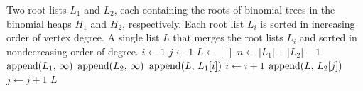 
\begin{algorithmic}[1]
\Require Two root lists $L_1$ and $L_2$, each containing the roots of
  binomial trees in the binomial heaps $H_1$ and $H_2$,
  respectively. Each root list $L_i$ is sorted in increasing order of
  vertex degree.
\Ensure A single list $L$ that merges the root lists $L_i$ and sorted
  in nondecreasing order of degree.
\State $i \gets 1$
\State $j \gets 1$
\State $L \gets [\,]$
\State $n \gets |L_1| + |L_2| - 1$
\State $\operatorname*{append}(L_1,\, \infty)$
\State $\operatorname*{append}(L_2,\, \infty)$
    \State $\operatorname*{append}(L,\, L_1[i])$
    \State $i \gets i + 1$
  \Else
    \State $\operatorname*{append}(L,\, L_2[j])$
    \State $j \gets j + 1$
  \EndIf
\EndFor
\State \Return $L$
\end{algorithmic}
